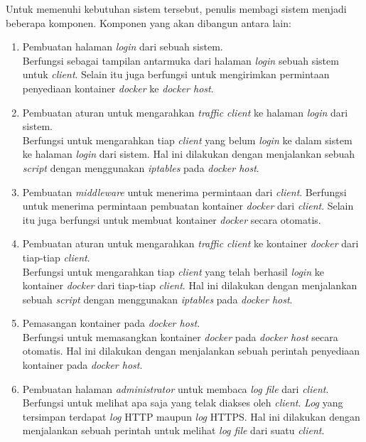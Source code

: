       \indent Untuk memenuhi kebutuhan sistem tersebut, penulis membagi sistem menjadi beberapa komponen. Komponen yang akan dibangun antara lain: 
      \begin{enumerate} 
      \item Pembuatan halaman \textit{login} dari sebuah sistem.\\
	      Berfungsi sebagai tampilan antarmuka dari halaman \textit{login} sebuah sistem untuk \textit{client}. Selain itu juga berfungsi untuk mengirimkan permintaan penyediaan kontainer \textit{docker} ke \textit{docker host}.
	  \item Pembuatan aturan untuk mengarahkan \textit{traffic client} ke halaman \textit{login} dari sistem.\\
		  Berfungsi untuk mengarahkan tiap \textit{client} yang belum \textit{login} ke dalam sistem ke halaman \textit{login} dari sistem. Hal ini dilakukan dengan menjalankan sebuah \textit{script} dengan menggunakan \textit{iptables} pada \textit{docker host}.
	  \item Pembuatan \textit{middleware} untuk menerima permintaan dari \textit{client}.
		  Berfungsi untuk menerima permintaan pembuatan kontainer \textit{docker} dari \textit{client}. Selain itu juga berfungsi untuk membuat kontainer \textit{docker} secara otomatis.
	  \item Pembuatan aturan untuk mengarahkan \textit{traffic client} ke kontainer \textit{docker} dari tiap-tiap \textit{client}.\\
		  Berfungsi untuk mengarahkan tiap \textit{client} yang telah berhasil \textit{login} ke kontainer \textit{docker} dari tiap-tiap \textit{client}. Hal ini dilakukan dengan menjalankan sebuah \textit{script} dengan menggunakan \textit{iptables} pada \textit{docker host}.
	  \item Pemasangan kontainer pada \textit{docker host}.\\
		  Berfungsi untuk memasangkan kontainer \textit{docker} pada \textit{docker host} secara otomatis. Hal ini dilakukan dengan menjalankan sebuah perintah penyediaan kontainer pada \textit{docker host}.
	  \item Pembuatan halaman \textit{administrator} untuk membaca \textit{log file} dari \textit{client}.\\
		  Berfungsi untuk melihat apa saja yang telak diakses oleh \textit{client}. \textit{Log} yang tersimpan terdapat \textit{log} HTTP maupun \textit{log} HTTPS.  Hal ini dilakukan dengan menjalankan sebuah perintah untuk melihat \textit{log file} dari suatu \textit{client}.
        
      \end{enumerate}
      
